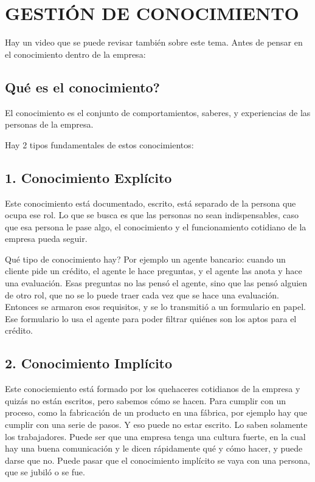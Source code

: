 \clearpage
\twocolumn
\hypertarget{gestiuxf3n-de-conocimiento}{%
\section{GESTIÓN DE CONOCIMIENTO}\label{unidad-4-gestiuxf3n-de-conocimiento}}

Hay un video que se puede revisar también sobre este tema. Antes de
pensar en el conocimiento dentro de la empresa:

\subsection{Qué es el conocimiento?}

El conocimiento es el conjunto de comportamientos, saberes, y
experiencias de las personas de la empresa.

Hay 2 tipos fundamentales de
estos conocimientos:

\hypertarget{conocimiento-expluxedcito}{%
\subsection{1. Conocimiento Explícito}\label{conocimiento-expluxedcito}}

Este conocimiento está documentado, escrito, está separado de la persona
que ocupa ese rol. Lo que se busca es que las personas no sean
indispensables, caso que esa persona le pase algo, el conocimiento y el
funcionamiento cotidiano de la empresa pueda seguir.

Qué tipo de conocimiento hay? Por ejemplo un agente bancario: cuando un
cliente pide un crédito, el agente le hace preguntas, y el agente las
anota y hace una evaluación. Esas preguntas no las pensó el agente, sino
que las pensó alguien de otro rol, que no se lo puede traer cada vez que
se hace una evaluación. Entonces se armaron esos requisitos, y se lo
transmitió a un formulario en papel. Ese formulario lo usa el agente
para poder filtrar quiénes son los aptos para el crédito.

\hypertarget{conocimiento-impluxedcito}{%
\subsection{2. Conocimiento Implícito}\label{conocimiento-impluxedcito}}

Este conociemiento está formado por los quehaceres cotidianos de la
empresa y quizás no están escritos, pero sabemos cómo se hacen. Para
cumplir con un proceso, como la fabricación de un producto en una
fábrica, por ejemplo hay que cumplir con una serie de pasos. Y eso puede
no estar escrito. Lo saben solamente los trabajadores. Puede ser que una
empresa tenga una cultura fuerte, en la cual hay una buena comunicación
y le dicen rápidamente qué y cómo hacer, y puede darse que no. Puede
pasar que el conocimiento implícito se vaya con una persona, que se
jubiló o se fue.

